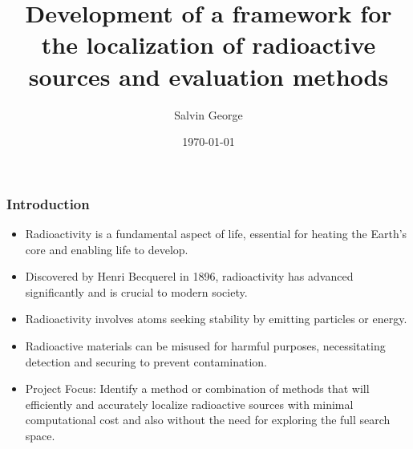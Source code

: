 \documentclass[aspectratio=169]{beamer}
\author[]{Salvin George}
\title{Development of a framework for the localization of radioactive sources and evaluation methods}
\institute[HBRS]{Hochschule Bonn-Rhein-Sieg}
\date{\today}
\begin{document}
\begin{frame}
\titlepage
\end{frame}



\begin{frame}
\frametitle{Introduction}

\begin{itemize}
  \item Radioactivity is a fundamental aspect of life, essential for heating the Earth's core and enabling life to develop.
  \item Discovered by Henri Becquerel in 1896, radioactivity has advanced significantly and is crucial to modern society. \cite{doe}
  \item Radioactivity involves atoms seeking stability by emitting particles or energy.
  \item Radioactive materials can be misused for harmful purposes, necessitating detection and securing to prevent contamination.
  \item Project Focus: Identify a method or combination of methods that will efficiently and accurately localize radioactive sources with minimal computational cost and also without the need for exploring the full search space.
\end{itemize}
\end{frame}


  
\end{document}
